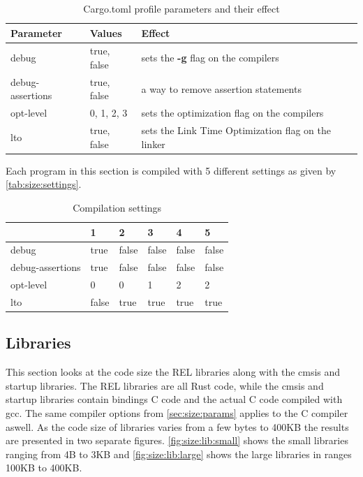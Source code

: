 \begin{table}[H]
  \centering
  \begin{tabular}{|l|l|l|}
    \hline
    Parameter & Values & Effect \\
    \hline
    debug & true, false & sets the \textbf{-g} flag on the compilers  \\
    debug-assertions & true, false & a way to remove assertion statements \\
    opt-level & 0, 1, 2, 3 & sets the optimization flag on the compilers \\
    lto & true, false & sets the Link Time Optimization flag on the linker \\
    \hline
  \end{tabular}
  \caption{Cargo.toml profile parameters and their effect}
  \label{tab:size:params}
\end{table}

Each program in this section is compiled with 5 different settings as given by \autoref{tab:size:settings}.
\begin{table}[H]
  \centering
  \begin{tabular}{|l|l|l|l|l|l|}
    \hline
    & 1     & 2     & 3     & 4     & 5     \\
    \hline
    debug            & true  & false & false & false & false \\
    debug-assertions & true  & false & false & false & false \\
    opt-level        & 0     & 0     & 1     & 2     & 2     \\
    lto              & false & true  & true  & true  & true  \\
    \hline
  \end{tabular}
  \caption{Compilation settings}
  \label{tab:size:settings}
\end{table}

\subsection{Libraries}

This section looks at the code size the REL libraries along with the cmsis and startup libraries.
The REL libraries are all Rust code, while the cmsis and startup libraries contain bindings C code and the actual C code compiled with gcc.
The same compiler options from \autoref{sec:size:params} applies to the C compiler aswell.
As the code size of libraries varies from a few bytes to 400KB the results are presented in two separate figures.
\autoref{fig:size:lib:small} shows the small libraries ranging from 4B to 3KB and \autoref{fig:size:lib:large} shows the large libraries in ranges 100KB to 400KB.

